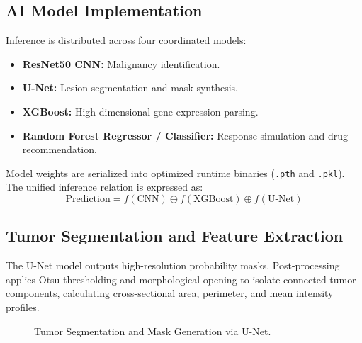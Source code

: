 \documentclass[conference]{IEEEtran}
\begin{document}
\subsection{AI Model Implementation}
Inference is distributed across four coordinated models:
\begin{itemize}
    \item \textbf{ResNet50 CNN:} Malignancy identification.
    \item \textbf{U-Net:} Lesion segmentation and mask synthesis.
    \item \textbf{XGBoost:} High-dimensional gene expression parsing.
    \item \textbf{Random Forest Regressor / Classifier:} Response simulation and drug recommendation.
\end{itemize}
Model weights are serialized into optimized runtime binaries (\texttt{.pth} and \texttt{.pkl}). The unified inference relation is expressed as:
\begin{equation}
\text{Prediction} = f(\text{CNN}) \oplus f(\text{XGBoost}) \oplus f(\text{U-Net})
\label{eq:inference}
\end{equation}

\subsection{Tumor Segmentation and Feature Extraction}
The U-Net model outputs high-resolution probability masks. Post-processing applies Otsu thresholding and morphological opening to isolate connected tumor components, calculating cross-sectional area, perimeter, and mean intensity profiles.

\begin{figure}[htbp]
\centering
{}
\caption{Tumor Segmentation and Mask Generation via U-Net.}
\label{fig:segmentation}
\end{figure}
\end{document}
